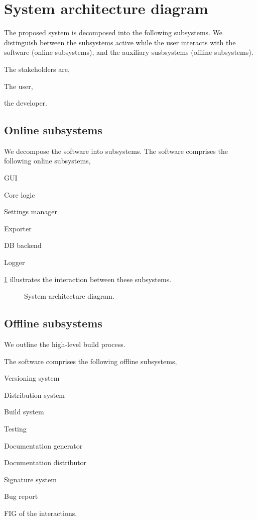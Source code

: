 \section{System architecture diagram}
The proposed system is decomposed into the following subsystems. We distinguish
between the subsystems active while the user interacts with the software (online
subsystems), and the auxiliary susbsystems (offline subsystems).

The stakeholders are,
\begin{compactitem}
\item The user,
\item the developer.
\end{compactitem}

\subsection{Online subsystems}
We decompose the software into subsystems.
The software comprises the following online subsystems,
\begin{compactitem}
\item GUI
\item Core logic
\item Settings manager
\item Exporter
\item DB backend
\item Logger
\end{compactitem}

\cref{fig:arch-diagram} illustrates the interaction between these
subsystems.

\begin{figure}
  
  \caption{\label{fig:arch-diagram} System architecture diagram.}
\end{figure}

\subsection{Offline subsystems}
We outline the high-level build process.

The software comprises the following offline subsystems,
\begin{compactitem}
\item Versioning system
\item Distribution system
\item Build system
\item Testing
\item Documentation generator
\item Documentation distributor
\item Signature system
\item Bug report
\end{compactitem}

FIG of the interactions.